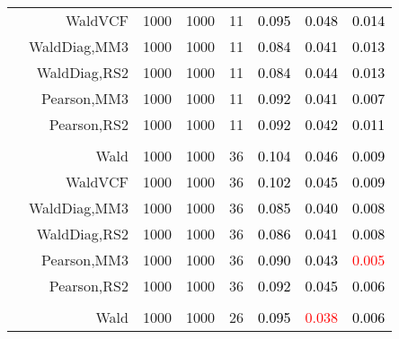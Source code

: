\documentclass[
]{article}
\begin{document}
\begin{table}[H]
{\begin{tabular}[t]{lrrrrrrr}
\hspace{1em} & WaldVCF & 1000 & 1000 & 11 & \textcolor{black}{0.095} & \textcolor{black}{0.048} & \textcolor{black}{0.014}\\

\hspace{1em} & WaldDiag,MM3 & 1000 & 1000 & 11 & \textcolor{black}{0.084} & \textcolor{black}{0.041} & \textcolor{black}{0.013}\\

\hspace{1em} & WaldDiag,RS2 & 1000 & 1000 & 11 & \textcolor{black}{0.084} & \textcolor{black}{0.044} & \textcolor{black}{0.013}\\

\hspace{1em} & Pearson,MM3 & 1000 & 1000 & 11 & \textcolor{black}{0.092} & \textcolor{black}{0.041} & \textcolor{black}{0.007}\\

\hspace{1em} & Pearson,RS2 & 1000 & 1000 & 11 & \textcolor{black}{0.092} & \textcolor{black}{0.042} & \textcolor{black}{0.011}\\
\cmidrule{1-8}
\addlinespace[0.3em]
\multicolumn{8}{l}{\textbf{1F 15V}}\\
\hspace{1em} & Wald & 1000 & 1000 & 36 & \textcolor{black}{0.104} & \textcolor{black}{0.046} & \textcolor{black}{0.009}\\

\hspace{1em} & WaldVCF & 1000 & 1000 & 36 & \textcolor{black}{0.102} & \textcolor{black}{0.045} & \textcolor{black}{0.009}\\

\hspace{1em} & WaldDiag,MM3 & 1000 & 1000 & 36 & \textcolor{black}{0.085} & \textcolor{black}{0.040} & \textcolor{black}{0.008}\\

\hspace{1em} & WaldDiag,RS2 & 1000 & 1000 & 36 & \textcolor{black}{0.086} & \textcolor{black}{0.041} & \textcolor{black}{0.008}\\

\hspace{1em} & Pearson,MM3 & 1000 & 1000 & 36 & \textcolor{black}{0.090} & \textcolor{black}{0.043} & \textcolor{red}{0.005}\\

\hspace{1em} & Pearson,RS2 & 1000 & 1000 & 36 & \textcolor{black}{0.092} & \textcolor{black}{0.045} & \textcolor{black}{0.006}\\
\cmidrule{1-8}
\addlinespace[0.3em]
\multicolumn{8}{l}{\textbf{2F 10V}}\\
\hspace{1em} & Wald & 1000 & 1000 & 26 & \textcolor{black}{0.095} & \textcolor{red}{0.038} & \textcolor{black}{0.006}\\


\end{tabular}}
\end{table}
\end{document}
